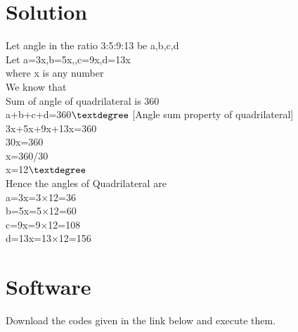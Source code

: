 \documentclass[journal,10pt,twocolumn]{article}
\begin{document}
\section{Solution}
\begin{flushleft}


Let angle in the ratio 3:5:9:13 be a,b,c,d\\
\vspace{0.25cm}
Let a=3x,b=5x,,c=9x,d=13x\\
\vspace{0.25cm}
where x is any number\\
\vspace{0.25cm}
We know that\\
\vspace{0.25cm}
Sum of angle of quadrilateral is 360\textdegree\\
\vspace{0.25cm}
a+b+c+d=360$\textdegree$   [Angle sum property of quadrilateral]\\
\vspace{0.25cm}
3x+5x+9x+13x=360\textdegree \\
\vspace{0.25cm}
30x=360\textdegree\\
\vspace{0.25cm}
x=360/30\\
\vspace{0.25cm}
x=12$\textdegree$\\
\vspace{0.25cm}
Hence the angles of Quadrilateral are\\
\vspace{0.25cm}
a=3x=3×12=36\textdegree\\
\vspace{0.25cm}
b=5x=5×12=60\textdegree\\
\vspace{0.25cm}
c=9x=9×12=108\textdegree\\
\vspace{0.25cm}
d=13x=13×12=156\textdegree
\end{flushleft}




\section{Software}
\begin{flushleft}
Download the codes given in the link below and execute them.\\
\end{flushleft}
\end{document}
